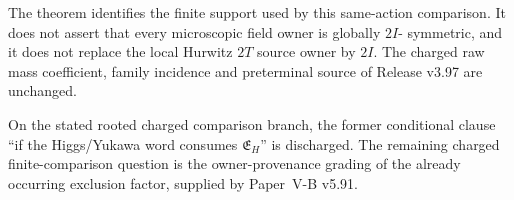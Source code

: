 \documentclass[12pt,a4paper]{article}
\begin{document}
\begin{remark}
\label{p5:rem:v398-comparison-support-firewall}
The theorem identifies the finite support used by this same-action comparison.
It does not assert that every microscopic field owner is globally $2I$-
symmetric, and it does not replace the local Hurwitz $2T$ source owner by
$2I$.  The charged raw mass coefficient, family incidence and preterminal
source of Release v3.97 are unchanged.
\end{remark}

\begin{corollary}
\label{p5:cor:v398-charged-exclusion-owner-dependent}
On the stated rooted charged comparison branch, the former conditional clause
``if the Higgs/Yukawa word consumes $\mathfrak E_H$'' is discharged.  The
remaining charged finite-comparison question is the owner-provenance grading
of the already occurring exclusion factor, supplied by Paper~V-B v5.91.
\end{corollary}
\end{document}
